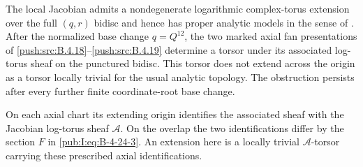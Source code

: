 \begin{proposition}\hypertarget{tag-030T}{}\label{push:src:B.4.24}
\label{push:B424}

The local Jacobian admits a nondegenerate logarithmic
complex-torus extension over the full $(q,r)$ bidisc and hence
has proper analytic models in the sense of
\citet{KKN2008Root}. After the normalized base change
$q=Q^{12}$, the two marked axial fan presentations of
\ref{push:src:B.4.18}--\ref{push:src:B.4.19} determine a torsor under its associated
log-torus sheaf on the punctured bidisc. This torsor does
not extend across the origin as a torsor locally trivial
for the usual analytic topology. The obstruction persists
after every further finite coordinate-root base change.

On each axial chart its extending origin identifies the associated sheaf with the Jacobian log-torus sheaf $\mathcal A$. On the overlap the two identifications differ by the section $F$ in \eqref{pub:I:eq:B-4-24-3}. An extension here is a locally trivial $\mathcal A$-torsor carrying these prescribed axial identifications.
\end{proposition}



